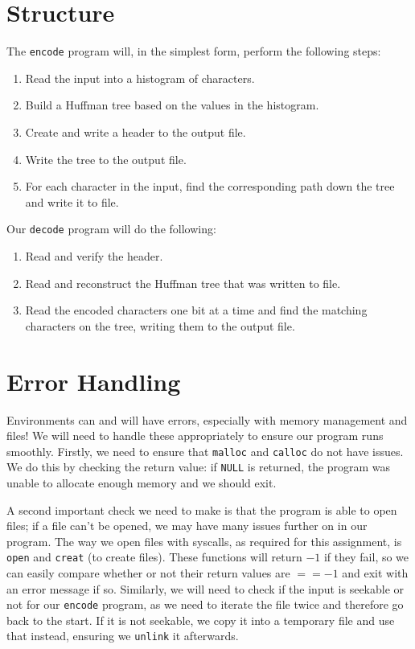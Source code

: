 \documentclass[12pt]{article}
\begin{document}
\section{Structure}

The \verb|encode| program will, in the simplest form, perform the following steps: \begin{enumerate}
    \item Read the input into a histogram of characters.
    \item Build a Huffman tree based on the values in the histogram.
    \item Create and write a header to the output file.
    \item Write the tree to the output file.
    \item For each character in the input, find the corresponding path down the tree and write it to file.
\end{enumerate}

Our \verb|decode| program will do the following: \begin{enumerate}
    \item Read and verify the header.
    \item Read and reconstruct the Huffman tree that was written to file.
    \item Read the encoded characters one bit at a time and find the matching characters on the tree, writing them to the output file.
\end{enumerate}
\section{Error Handling}

Environments can and will have errors, especially with memory management and files! We will need to handle these appropriately to ensure our program runs smoothly. Firstly, we need to ensure that \verb|malloc| and \verb|calloc| do not have issues. We do this by checking the return value: if \verb|NULL| is returned, the program was unable to allocate enough memory and we should exit.

A second important check we need to make is that the program is able to open files; if a file can't be opened, we may have many issues further on in our program. The way we open files with syscalls, as required for this assignment, is \verb|open| and \verb|creat| (to create files). These functions will return $-1$ if they fail, so we can easily compare whether or not their return values are $== -1$ and exit with an error message if so. Similarly, we will need to check if the input is seekable or not for our \verb|encode| program, as we need to iterate the file twice and therefore go back to the start. If it is not seekable, we copy it into a temporary file and use that instead, ensuring we \verb|unlink| it afterwards.
\end{document}
